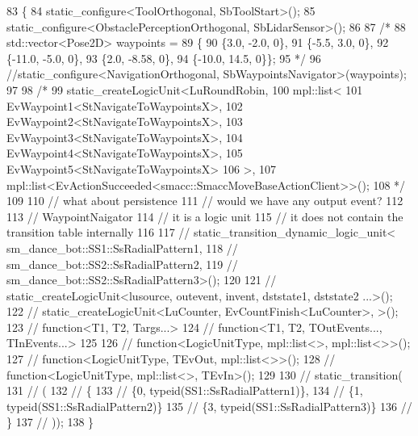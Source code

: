 \begin{DoxyCode}
83   \{
84     static\_configure<ToolOrthogonal, SbToolStart>();
85     static\_configure<ObstaclePerceptionOrthogonal, SbLidarSensor>();
86 
87     \textcolor{comment}{/*}
88 \textcolor{comment}{    std::vector<Pose2D> waypoints =}
89 \textcolor{comment}{        \{}
90 \textcolor{comment}{            \{3.0, -2.0, 0\},}
91 \textcolor{comment}{            \{-5.5, 3.0, 0\},}
92 \textcolor{comment}{            \{-11.0, -5.0, 0\},}
93 \textcolor{comment}{            \{2.0, -8.58, 0\},}
94 \textcolor{comment}{            \{-10.0, 14.5, 0\}\};}
95 \textcolor{comment}{*/}
96     \textcolor{comment}{//static\_configure<NavigationOrthogonal, SbWaypointsNavigator>(waypoints);}
97 
98     \textcolor{comment}{/*}
99 \textcolor{comment}{    static\_createLogicUnit<LuRoundRobin, }
100 \textcolor{comment}{                              mpl::list<}
101 \textcolor{comment}{                                   EvWaypoint1<StNavigateToWaypointsX>,}
102 \textcolor{comment}{                                   EvWaypoint2<StNavigateToWaypointsX>,}
103 \textcolor{comment}{                                   EvWaypoint3<StNavigateToWaypointsX>, }
104 \textcolor{comment}{                                   EvWaypoint4<StNavigateToWaypointsX>,}
105 \textcolor{comment}{                                   EvWaypoint5<StNavigateToWaypointsX>}
106 \textcolor{comment}{                                  >, }
107 \textcolor{comment}{                         mpl::list<EvActionSucceeded<smacc::SmaccMoveBaseActionClient>>();}
108 \textcolor{comment}{                         */}
109 
110     \textcolor{comment}{// what about persistence}
111     \textcolor{comment}{// would we have any output event?}
112 
113     \textcolor{comment}{// WaypointNaigator}
114     \textcolor{comment}{// it is a logic unit}
115     \textcolor{comment}{// it does not contain the transition table internally}
116 
117     \textcolor{comment}{// static\_transition\_dynamic\_logic\_unit< sm\_dance\_bot::SS1::SsRadialPattern1,}
118     \textcolor{comment}{//                                       sm\_dance\_bot::SS2::SsRadialPattern2,}
119     \textcolor{comment}{//                                       sm\_dance\_bot::SS2::SsRadialPattern3>();}
120 
121     \textcolor{comment}{// static\_createLogicUnit<lusource, outevent, invent, dststate1, dststate2 ...>();}
122     \textcolor{comment}{// static\_createLogicUnit<LuCounter, EvCountFinish<LuCounter>,    >();}
123     \textcolor{comment}{// function<T1, T2, Targs...>}
124     \textcolor{comment}{// function<T1, T2, TOutEvents..., TInEvents...>}
125 
126     \textcolor{comment}{// function<LogicUnitType, mpl::list<>, mpl::list<>>();}
127     \textcolor{comment}{// function<LogicUnitType, TEvOut, mpl::list<>>();}
128     \textcolor{comment}{// function<LogicUnitType, mpl::list<>, TEvIn>();}
129 
130     \textcolor{comment}{// static\_transition(}
131     \textcolor{comment}{// (}
132     \textcolor{comment}{//   \{}
133     \textcolor{comment}{//     \{0, typeid(SS1::SsRadialPattern1)\},}
134     \textcolor{comment}{//     \{1, typeid(SS1::SsRadialPattern2)\}}
135     \textcolor{comment}{//     \{3, typeid(SS1::SsRadialPattern3)\}}
136     \textcolor{comment}{//   \}}
137     \textcolor{comment}{// ));}
138   \}
\end{DoxyCode}
